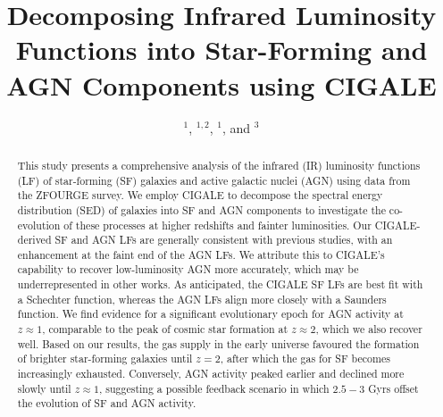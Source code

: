 


\title{Decomposing Infrared Luminosity Functions into Star-Forming and AGN Components using CIGALE}

\author{ $^{1}$,  
         $^{1,2}$,
         $^{1}$,
        and  $^{3}$}





\begin{abstract}
    This study presents a comprehensive analysis of the infrared (IR) luminosity functions (LF) of star-forming (SF) galaxies and active galactic nuclei (AGN) using data from the ZFOURGE survey. We employ CIGALE to decompose the spectral energy distribution (SED) of galaxies into SF and AGN components to investigate the co-evolution of these processes at higher redshifts and fainter luminosities. Our CIGALE-derived SF and AGN LFs are generally consistent with previous studies, with an enhancement at the faint end of the AGN LFs. We attribute this to CIGALE's capability to recover low-luminosity AGN more accurately, which may be underrepresented in other works. As anticipated, the CIGALE SF LFs are best fit with a Schechter function, whereas the AGN LFs align more closely with a Saunders function. We find evidence for a significant evolutionary epoch for AGN activity at $z \approx 1$, comparable to the peak of cosmic star formation at $z \approx 2$, which we also recover well. Based on our results, the gas supply in the early universe favoured the formation of brighter star-forming galaxies until $z=2$, after which the gas for SF becomes increasingly exhausted. Conversely, AGN activity peaked earlier and declined more slowly until $z \approx 1$, suggesting a possible feedback scenario in which $2.5-3$ Gyrs offset the evolution of SF and AGN activity. 
\end{abstract}

